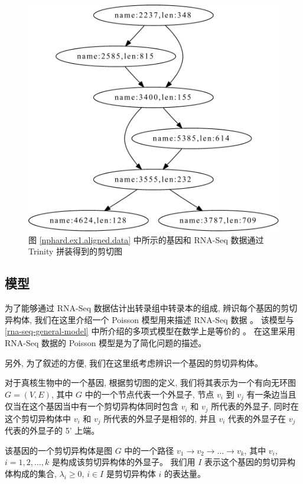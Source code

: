 \begin{figure}[!t]
\centering
\includegraphics[width=\textwidth]{figures/nphard/comp1.pdf}
\caption{图 \ref{nphard.ex1.aligned.data} 中所示的基因和 
RNA-Seq 数据通过 Trinity \cite{grabherr2011full} 拼装得到的剪切图}
\label{nphard.ex1.splicing.graph}
\end{figure}

\subsection{模型}
\label{nphard-model}

为了能够通过 RNA-Seq 数据估计出转录组中转录本的组成, 辨识每个基因的剪切异构体, 
我们在这里介绍一个 Poisson 模型用来描述 RNA-Seq 数据 \cite{Jiang15042009}。 
该模型与 \ref{rna-seq-general-model} 中所介绍的多项式模型在数学上是等价的 
\cite{2011arXiv1104.3889P}。 
在这里采用 RNA-Seq 数据的 Poisson 模型是为了简化问题的描述。 

另外, 为了叙述的方便, 我们在这里纸考虑辨识一个基因的剪切异构体。 

对于真核生物中的一个基因, 根据剪切图的定义, 
我们将其表示为一个有向无环图 $G=(V,E)$, 其中 $G$ 中的一个节点代表一个外显子, 
节点 $v_i$ 到 $v_j$ 有一条边当且仅当在这个基因当中有一个剪切异构体同时包含 
$v_i$ 和 $v_j$ 所代表的外显子, 
同时在这个剪切异构体中 $v_i$ 和 $v_j$ 所代表的外显子是相邻的, 
并且 $v_i$ 代表的外显子在 $v_j$ 代表的外显子的 5' 上端。 

该基因的一个剪切异构体是图 $G$ 中的一个路径 $v_1 \to v_2 \to \ldots \to v_k$, 
其中 $v_i$, $i=1,2,\ldots,k$ 是构成该剪切异构体的外显子。 
我们用 $I$ 表示这个基因的剪切异构体构成的集合, $\lambda_i \geq 0$, 
$i \in I$ 是剪切异构体 $i$ 的表达量。 

